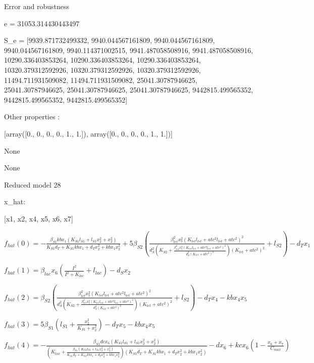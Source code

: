 Error and robustness 


e = 31053.314430443497

S_e = [9939.871732499332, 9940.044567161809, 9940.044567161809, 9940.044567161809, 9940.114371002515, 9941.487058508916, 9941.487058508916, 10290.336403853264, 10290.336403853264, 10290.336403853264, 10320.379312592926, 10320.379312592926, 10320.379312592926, 11494.711931509082, 11494.711931509082, 25041.30787946625, 25041.30787946625, 25041.30787946625, 25041.30787946625, 9442815.499565352, 9442815.499565352, 9442815.499565352]

Other properties :


[array([0., 0., 0., 0., 1., 1.]), array([0., 0., 0., 0., 1., 1.])]

None

None

Reduced model 28

x_{hat}: 

[x1, x2, x4, x5, x6, x7]


$f_{hat}(0)=- \frac{\beta_{S1} kb x_{1} \left(K_{S1} l_{S1} + l_{S1} x_{2}^{2} + x_{2}^{2}\right)}{K_{S1} d_{T} + K_{S1} kb x_{1} + d_{T} x_{2}^{2} + kb x_{1} x_{2}^{2}} + 5 \beta_{S2} \left(\frac{\beta_{tet}^{2} x_{7}^{2} \left(K_{tet} l_{tet} + atc^{2} l_{tet} + atc^{2}\right)^{2}}{d_{S}^{2} \left(K_{S2} + \frac{\beta_{tet}^{2} x_{7}^{2} \left(K_{tet} l_{tet} + atc^{2} l_{tet} + atc^{2}\right)^{2}}{d_{S}^{2} \left(K_{tet} + atc^{2}\right)^{2}}\right) \left(K_{tet} + atc^{2}\right)^{2}} + l_{S2}\right) - d_{T} x_{1}$


$f_{hat}(1)=\beta_{lac} x_{6} \left(\frac{I^{2}}{I^{2} + K_{lac}} + l_{lac}\right) - d_{S} x_{2}$


$f_{hat}(2)=\beta_{S2} \left(\frac{\beta_{tet}^{2} x_{7}^{2} \left(K_{tet} l_{tet} + atc^{2} l_{tet} + atc^{2}\right)^{2}}{d_{S}^{2} \left(K_{S2} + \frac{\beta_{tet}^{2} x_{7}^{2} \left(K_{tet} l_{tet} + atc^{2} l_{tet} + atc^{2}\right)^{2}}{d_{S}^{2} \left(K_{tet} + atc^{2}\right)^{2}}\right) \left(K_{tet} + atc^{2}\right)^{2}} + l_{S2}\right) - d_{T} x_{4} - kb x_{4} x_{5}$


$f_{hat}(3)=5 \beta_{S1} \left(l_{S1} + \frac{x_{2}^{2}}{K_{S1} + x_{2}^{2}}\right) - d_{T} x_{5} - kb x_{4} x_{5}$


$f_{hat}(4)=- \frac{\beta_{S1} dc x_{6} \left(K_{S1} l_{S1} + l_{S1} x_{2}^{2} + x_{2}^{2}\right)}{\left(K_{tox} + \frac{\beta_{S1} \left(K_{S1} l_{S1} + l_{S1} x_{2}^{2} + x_{2}^{2}\right)}{K_{S1} d_{T} + K_{S1} kb x_{1} + d_{T} x_{2}^{2} + kb x_{1} x_{2}^{2}}\right) \left(K_{S1} d_{T} + K_{S1} kb x_{1} + d_{T} x_{2}^{2} + kb x_{1} x_{2}^{2}\right)} - d x_{6} + kc x_{6} \left(1 - \frac{x_{6} + x_{7}}{C_{max}}\right)$


